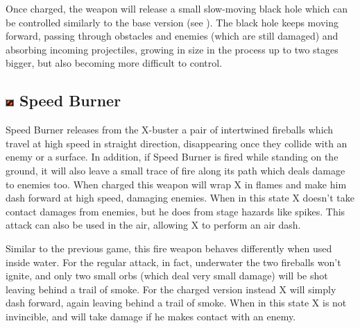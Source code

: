 Once charged, the weapon will release a small slow-moving black hole which can be controlled similarly to the base version (see ). The black hole keeps moving forward, passing through obstacles and enemies (which are still damaged) and absorbing incoming projectiles, growing in size in the process up to two stages bigger, but also becoming more difficult to control.



\subsection{\includegraphics[width=12px, height=10px]{figures/X2/weapons/S_burner.png} Speed Burner}\label{Speed_burner}
Speed Burner releases from the X-buster a pair of intertwined fireballs which travel at high speed in straight direction, disappearing once they collide with an enemy or a surface. In addition, if Speed Burner is fired while standing on the ground, it will also leave a small trace of fire along its path which deals damage to enemies too. When charged this weapon will wrap X in flames and make him dash forward at high speed, damaging enemies. When in this state X doesn't take contact damages from enemies, but he does from stage hazards like spikes. This attack can also be used in the air, allowing X to perform an air dash.

Similar to the previous game, this fire weapon behaves differently when used inside water. For the regular attack, in fact, underwater the two fireballs won't ignite, and only two small orbs (which deal very small damage) will be shot leaving behind a trail of smoke. For the charged version instead X will simply dash forward, again leaving behind a trail of smoke. When in this state X is not invincible, and will take damage if he makes contact with an enemy.

